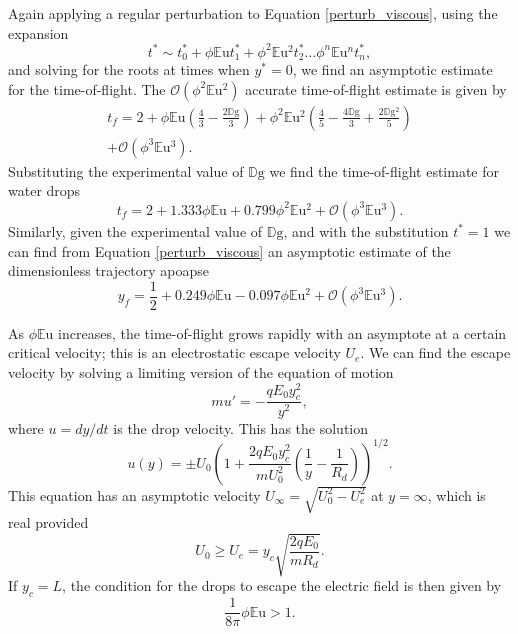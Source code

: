 \documentclass[aip,reprint, floatfix]{revtex4-1}
\begin{document}
Again applying a regular perturbation to Equation \ref{perturb_viscous}, using the expansion
\[ t^* \sim t^*_0 + \phi \mathbb{E}\mbox{u} t^*_1 + \phi^2 \mathbb{E}\mbox{u}^2 t^*_2 \ldots \phi^n \mathbb{E}\mbox{u}^n t^*_n  
,\]
and solving for the roots at times when $y^* = 0$, we find an asymptotic estimate for the time-of-flight. The $\mathcal{O}(\phi^2 \mathbb{E}\mbox{u}^2)$ accurate time-of-flight estimate is given by
\begin{gather*}
t_f = 2 + \phi \mathbb{E}\mbox{u} \left(\frac{4}{3} - \frac{2 \mathbb{D}\mbox{g}}{3}\right) 
+ \phi^2 \mathbb{E}\mbox{u}^{2} \left(\frac{4}{5} - \frac{4 \mathbb{D}\mbox{g}}{3} + \frac{2 \mathbb{D}\mbox{g}^{2}}{5}\right) \\
+ \mathcal{O}(\phi^3 \mathbb{E}\mbox{u}^3).
\end{gather*}
Substituting the experimental value of $\mathbb{D}\mbox{g}$ we find the time-of-flight estimate for water drops
\begin{equation} \label{time_of_flight}
t_f = 2 + 1.333 \phi \mathbb{E}\mbox{u} + 0.799 \phi^2 \mathbb{E}\mbox{u}^{2} + \mathcal{O}(\phi^3 \mathbb{E}\mbox{u}^3). 
\end{equation} 
Similarly, given the experimental value of $\mathbb{D}\mbox{g}$, and with the substitution $t^*=1$ we can find from Equation \ref{perturb_viscous} an asymptotic estimate of the dimensionless trajectory apoapse
\begin{equation} \label{dimless_apoapse}
y_f = \frac{1}{2} + 0.249 \phi \mathbb{E}\mbox{u} - 0.097 \phi \mathbb{E}\mbox{u}^{2} + \mathcal{O}(\phi^3 \mathbb{E}\mbox{u}^3).
\end{equation}

As $\phi \mathbb{E}\mbox{u}$ increases, the time-of-flight grows rapidly with an asymptote at a certain critical velocity; this is an electrostatic escape velocity $U_e$. We can find the escape velocity by solving a limiting version of the equation of motion
\[ m u' = - \frac{q E_0 y_c^2}{y^2}, \]
where $u = d y / d t$ is the drop velocity. This has the solution
\[ u(y) = \pm U_0 \left(1 + \frac{2q E_0 y_c^2}{m U_0^2} \left( \frac{1}{y} - \frac{1}{R_d} \right) \right)^{1/2}.
\]
This equation has an asymptotic velocity $U_{\infty} = \sqrt{U_0^2 - U_e^2}$ at $y = \infty$, which is real provided 
\[ U_0 \geq  U_e = y_c \sqrt{\frac{2 q E_0 }{m R_d}}.
\]
If $y_c=L$, the condition for the drops to escape the electric field is then given by
\begin{equation}\label{escape}
\frac{1}{8 \pi} \phi \mathbb{E}\mbox{u} > 1.
\end{equation}
\end{document}

